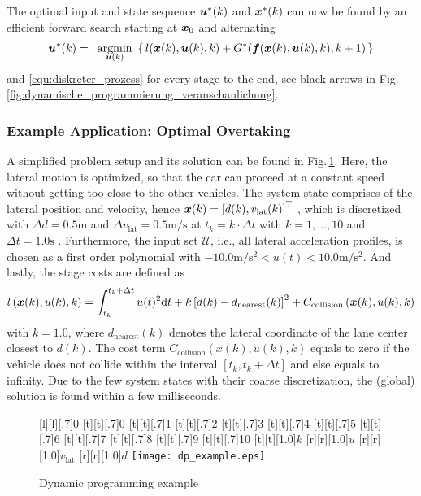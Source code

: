The optimal input and state sequence $\boldsymbol{u}^\ast (k)$ and $\boldsymbol{x}^\ast (k)$ can now be found by an efficient forward search starting at $\boldsymbol{x}_0$ and alternating
\begin{align} \label{equ:navigation_function}
\bs u^\ast(k) = \argmin{\bs u(k)}\{\,l(\bs x(k), \bs u(k), k) + G^\ast(\bs f(\bs x(k), \bs u(k),k), k+1)\,\}
\end{align}
and \eqref{equ:diskreter_prozess} for every stage to the end, see black arrows in  Fig.\,\ref{fig:dynamische_programmierung_veranschaulichung}.

\subsubsection{Example Application: Optimal Overtaking}\label{S:57.3.3.3}
A simplified problem setup and its solution can be found in Fig.\,\ref{fig:dynamische_programmierung_example}.
Here, the lateral motion is optimized, so that the car can proceed at a constant speed without getting too close to the other vehicles. 
The system state comprises of the lateral position and velocity, hence 
$\boldsymbol{x}(k)=\left[d(k),v_\mathrm{lat}(k)\right]^{{\rm T}}$ , which is discretized with $\Delta d=0.5 \mathrm{m}$  and $\Delta v_\mathrm{lat}  =0.5\mathrm{m/s}$  at $t_k=k\cdot \Delta t$ with $k=1,\dots,10$ and $\Delta t=1.0 \mathrm{s}$ . Furthermore, the input set $\mathcal{U}$, i.e., all lateral acceleration profiles, is chosen as a first order polynomial with $-10.0\mathrm{m/s^2} <u(t)< 10.0\mathrm{m/s^2}$. And lastly, the stage costs are defined as
\begin{align*}
	l \left(\boldsymbol{x}(k),u(k),k\right) = \int_{t_k}^{t_k+\Delta t}{u(t)^2 {\rm d}t}+k\left[d(k)-d_\mathrm{nearest}(k)\right]^2 +C_\mathrm{collision}\left(\boldsymbol{x}(k),u(k),k\right)
\end{align*}
with $k=1.0$, where $d_\mathrm{nearest}(k)$ denotes the lateral coordinate of the lane center closest to $d(k)$. 
The cost term $C_\mathrm{collision} \left(x(k),u(k),k\right)$ equals to zero if the vehicle does not collide within the interval $\left[t_k,t_k+\Delta t\right]$ and else equals to infinity. 
Due to the few system states with their coarse discretization, the (global) solution is found within a few milliseconds.

\begin{figure}[h]
	[l][.7]{0}
	[t][.7]{0}
	[t][.7]{1}
	[t][.7]{2}
	[t][.7]{3}
	[t][.7]{4}
	[t][.7]{5}
	[t][.7]{6}
	[t][.7]{7}
	[t][.7]{8}
	[t][.7]{9}
	[t][.7]{10}
	[t][1.0]{$k$}
	[r][1.0]{$u$}
	[r][1.0]{$v_\text{lat}$}
	[r][1.0]{$d$}
	\centering
	\centering
  	\texttt{[image: dp\_example.eps]}
	\caption[Dynamic programming example]{Dynamic programming example}
	\label{fig:dynamische_programmierung_example}
\end{figure} 


